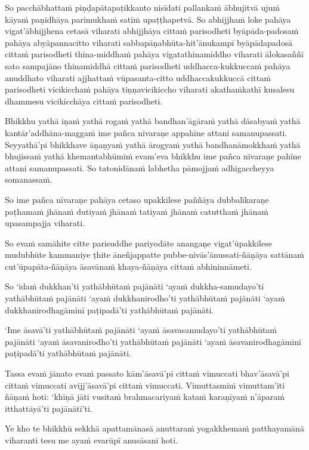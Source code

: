 So pacchābhattaṁ piṇḍapātapaṭikkanto nisīdati pallankaṁ ābhujitvā ujuṁ kāyaṁ paṇidhāya parimukhaṁ satiṁ upaṭṭhapetvā. So abhijjhaṁ loke pahāya vigat'ābhijjhena cetasā viharati abhijjhāya cittaṁ parisodheti byāpāda-padosaṁ pahāya abyāpannacitto viharati sabbapāṇabhūta-hit'ānukampī byāpādapadosā cittaṁ parisodheti thina-middhaṁ pahāya vigatathinamiddho viharati ālokasaññī sato sampajāno thinamiddhā cittaṁ parisodheti uddhacca-kukkuccaṁ pahāya anuddhato viharati ajjhattaṁ vūpasanta-citto uddhaccakukkuccā cittaṁ parisodheti vicikicchaṁ pahāya tiṇṇavicikiccho viharati akathaṁkathī kusalesu dhammesu vicikicchāya cittaṁ parisodheti.

\suttaRef{[MN 107]}

Bhikkhu yathā iṇaṁ yathā rogaṁ yathā bandhan'āgāraṁ yathā dāsabyaṁ yathā kantār'addhāna-maggaṁ ime pañca nīvaraṇe appahīne attani samanupassati. Seyyathā'pi bhikkhave āṇaṇyaṁ yathā ārogyaṁ yathā bandhanāmokkhaṁ yathā bhujissaṁ yathā khemantabhūmiṁ evam'eva bhikkhu ime pañca nīvaraṇe pahīne attani samanupassati. So tatonidānaṁ labhetha pāmojjaṁ adhigaccheyya somanassaṁ.

So ime pañca nīvaraṇe pahāya cetaso upakkilese paññāya dubbalīkaraṇe paṭhamaṁ jhānaṁ dutiyaṁ jhānaṁ tatiyaṁ jhānaṁ catutthaṁ jhānaṁ upasampajja viharati.

So evaṁ samāhite citte parisuddhe pariyodāte anangaṇe vigat'ūpakkilese mudubhūte kammaniye ṭhite āneñjappatte pubbe-nivās'ānussati-ñāṇāya sattānaṁ cut'ūpapāta-ñāṇāya āsavānaṁ khaya-ñāṇāya cittaṁ abhininnāmeti.

So `idaṁ dukkhan'ti yathābhūtaṁ pajānāti `ayaṁ dukkha-samudayo'ti yathābhūtaṁ pajānāti `ayaṁ dukkhanirodho'ti yathābhūtaṁ pajānāti `ayaṁ dukkhanirodhagāminī paṭipadā'ti yathābhūtaṁ pajānāti.

`Ime āsavā'ti yathābhūtaṁ pajānāti `ayaṁ āsavasamudayo'ti yathābhūtaṁ pajānāti `ayaṁ āsavanirodho'ti yathābhūtaṁ pajānāti `ayaṁ āsavanirodhagāminī paṭipadā'ti yathābhūtaṁ pajānāti.

Tassa evaṁ jānato evaṁ passato kām'āsavā'pi cittaṁ vimuccati bhav'āsavā'pi cittaṁ vimuccati avijj'āsavā'pi cittaṁ vimuccati. Vimuttasmiṁ vimuttam'iti ñāṇaṁ hoti: `khīṇā jāti vusitaṁ brahmacariyaṁ kataṁ karaṇīyaṁ n'āparaṁ itthattāyā'ti pajānātī'ti.

\suttaRef{[MN 39]}

Ye kho te bhikkhū sekkhā apattamānasā anuttaraṁ yogakkhemaṁ patthayamānā viharanti tesu me ayaṁ evarūpī anusāsanī hoti.

\suttaRef{[MN 107]}


